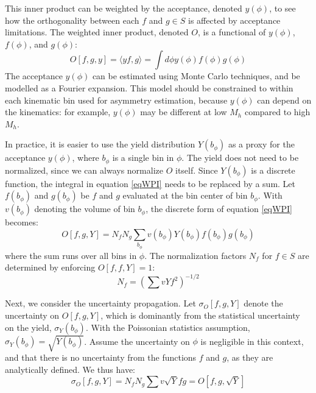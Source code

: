 \documentclass[12pt]{article}
\begin{document}
This inner product can be weighted by the acceptance, denoted $y(\phi)$, to see how the
orthogonality between each $f$ and $g\in S$ is affected by acceptance
limitations. The weighted inner product, denoted $O$,
is a functional of $y(\phi)$, $f(\phi)$, and $g(\phi)$:
\begin{equation}
O\left[f,g,y\right]=\langle yf,g\rangle=\int{d\phi y(\phi)f(\phi)g(\phi)}
\label{eqWPI}
\end{equation}
The acceptance $y(\phi)$ can be estimated using Monte Carlo techniques, and be
modelled as a Fourier expansion. This model should be constrained to within each
kinematic bin used for asymmetry estimation, because $y(\phi)$ can depend on the
kinematics: for example, $y(\phi)$ may be different at low $M_h$ compared to
high $M_h$.

In practice, it is easier to use the yield distribution $Y(b_\phi)$ as a proxy for the
acceptance $y(\phi)$, where $b_\phi$ is a single bin in $\phi$. The yield does
not need to be normalized, since we can always normalize $O$ itself. Since
$Y(b_\phi)$ is a discrete function, the integral in equation \ref{eqWPI} needs
to be replaced by a sum. Let $f(b_\phi)$ and $g(b_\phi)$ be $f$ and $g$
evaluated at the bin center of bin $b_\phi$. With $v(b_\phi)$ denoting the volume of
bin $b_\phi$, the discrete form of equation \ref{eqWPI} becomes:
\begin{equation}
\displaystyle
O[f,g,Y]=N_fN_g\sum_{b_\phi}{
  v(b_\phi)Y(b_\phi)f(b_\phi)g(b_\phi)
}
\end{equation}
where the sum runs over all bins in $\phi$.
The normalization factors $N_f$ for $f\in S$ are determined by enforcing
$O[f,f,Y]=1$:
\begin{equation}
\displaystyle
N_f=\left(\sum{vYf^2}\right)^{-1/2}
\end{equation}

Next, we consider the uncertainty propagation. Let $\sigma_O[f,g,Y]$ denote the
uncertainty on $O[f,g,Y]$, which is dominantly from the statistical uncertainty
on the yield, $\sigma_Y(b_\phi)$. With the Poissonian statistics assumption,
$\sigma_Y(b_\phi)=\sqrt{Y(b_\phi)}$. Assume the uncertainty on $\phi$ is
negligible in this context, and that there is no uncertainty from the functions
$f$ and $g$, as they are analytically defined. We thus have:
\begin{equation}
\sigma_O[f,g,Y]=N_fN_g\sum{v\sqrt{Y}fg}=O\left[f,g,\sqrt{Y}\right]
\end{equation}
\end{document}
